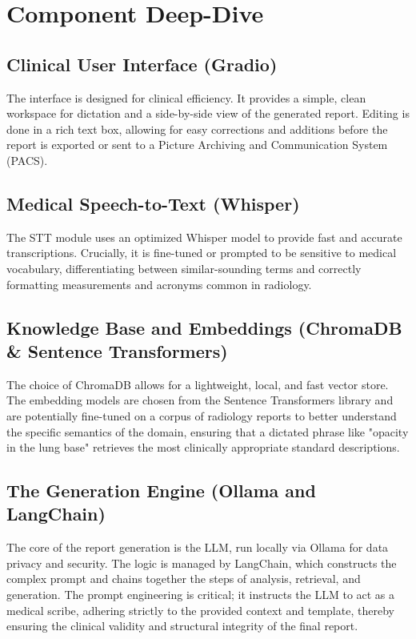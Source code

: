 \section{Component Deep-Dive}

\subsection{Clinical User Interface (Gradio)}
The interface is designed for clinical efficiency. It provides a simple, clean workspace for dictation and a side-by-side view of the generated report. Editing is done in a rich text box, allowing for easy corrections and additions before the report is exported or sent to a Picture Archiving and Communication System (PACS).

\subsection{Medical Speech-to-Text (Whisper)}
The STT module uses an optimized Whisper model to provide fast and accurate transcriptions. Crucially, it is fine-tuned or prompted to be sensitive to medical vocabulary, differentiating between similar-sounding terms and correctly formatting measurements and acronyms common in radiology.

\subsection{Knowledge Base and Embeddings (ChromaDB \& Sentence Transformers)}
The choice of ChromaDB allows for a lightweight, local, and fast vector store. The embedding models are chosen from the Sentence Transformers library and are potentially fine-tuned on a corpus of radiology reports to better understand the specific semantics of the domain, ensuring that a dictated phrase like "opacity in the lung base" retrieves the most clinically appropriate standard descriptions.

\subsection{The Generation Engine (Ollama and LangChain)}
The core of the report generation is the LLM, run locally via Ollama for data privacy and security. The logic is managed by LangChain, which constructs the complex prompt and chains together the steps of analysis, retrieval, and generation. The prompt engineering is critical; it instructs the LLM to act as a medical scribe, adhering strictly to the provided context and template, thereby ensuring the clinical validity and structural integrity of the final report.